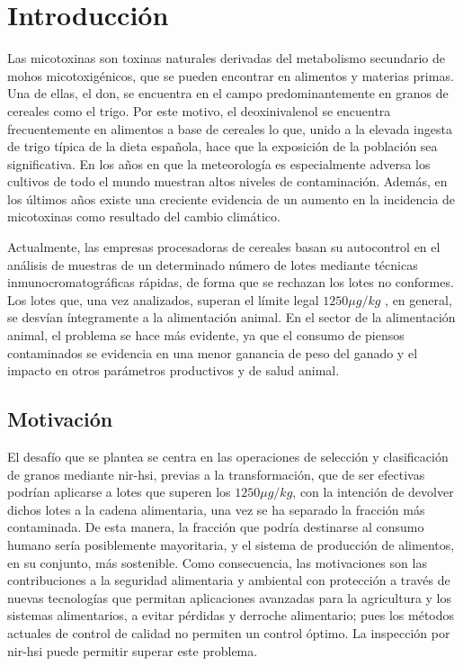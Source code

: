 \section{Introducción}

Las micotoxinas son toxinas naturales derivadas del metabolismo secundario de mohos micotoxigénicos, que se pueden encontrar en alimentos y materias primas. Una de ellas, el \acrfull{don}, se encuentra en el campo predominantemente en granos de cereales como el trigo. Por este motivo, el deoxinivalenol se encuentra frecuentemente en alimentos a base de cereales lo que, unido a la elevada ingesta de trigo típica de la dieta española, hace que la exposición de la población sea significativa. En los años en que la meteorología es especialmente adversa los cultivos de todo el mundo muestran altos niveles de contaminación. Además, en los últimos años existe una creciente evidencia de un aumento en la incidencia de micotoxinas como resultado del cambio climático. \cite{https://doi.org/10.2903/j.efsa.2017.4718}

Actualmente, las empresas procesadoras de cereales basan su autocontrol en el análisis de muestras de un determinado número de lotes mediante técnicas inmunocromatográficas
rápidas, de forma que se rechazan los lotes no conformes. Los lotes que, una vez analizados, superan el límite legal \(1250 \mu g/kg\) \cite{EURLex0285:online}, en general, se desvían íntegramente
a la alimentación animal. En el sector de la alimentación animal, el problema se hace más evidente, ya que el consumo de piensos contaminados se evidencia en una menor
ganancia de peso del ganado y el impacto en otros parámetros productivos y de salud animal.


\subsection{Motivación}

El desafío que se plantea se centra en las operaciones de selección y clasificación de granos mediante \gls{nir-hsi}, previas a la transformación, que
de ser efectivas podrían aplicarse a lotes que superen los \(1250 \mu g/kg\), con la intención de devolver dichos lotes a la cadena alimentaria, una vez se ha separado
la fracción más contaminada. De esta manera, la fracción que podría destinarse al consumo humano sería posiblemente mayoritaria, y el sistema de producción de alimentos,
en su conjunto, más sostenible. Como consecuencia, las motivaciones son las contribuciones a la seguridad alimentaria y ambiental con protección a través de nuevas 
tecnologías que permitan aplicaciones avanzadas para la agricultura y los sistemas alimentarios, a evitar pérdidas y derroche alimentario; pues los métodos actuales de 
control de calidad no permiten un control óptimo. La inspección por \gls{nir-hsi} puede permitir superar este problema.


